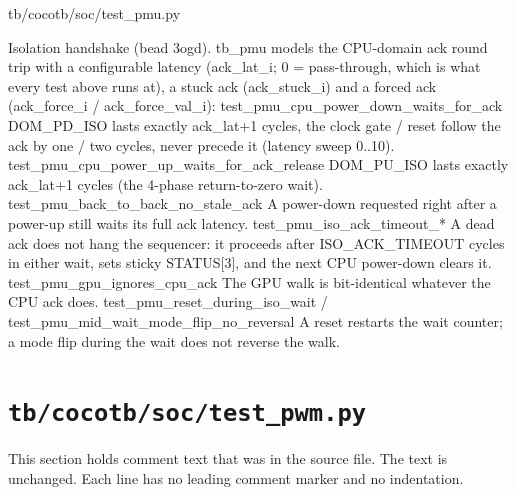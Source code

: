 \begin{relocated}{tb/cocotb/soc/test_pmu.py}
\begin{textblock}
Isolation handshake (bead 3ogd).  tb_pmu models the CPU-domain ack round trip with a
configurable latency (ack_lat_i; 0 = pass-through, which is what every test above runs at),
a stuck ack (ack_stuck_i) and a forced ack (ack_force_i / ack_force_val_i):
test_pmu_cpu_power_down_waits_for_ack
DOM_PD_ISO lasts exactly ack_lat+1 cycles, the clock gate / reset follow the ack by one /
two cycles, never precede it (latency sweep 0..10).
test_pmu_cpu_power_up_waits_for_ack_release
DOM_PU_ISO lasts exactly ack_lat+1 cycles (the 4-phase return-to-zero wait).
test_pmu_back_to_back_no_stale_ack
A power-down requested right after a power-up still waits its full ack latency.
test_pmu_iso_ack_timeout_*
A dead ack does not hang the sequencer: it proceeds after ISO_ACK_TIMEOUT cycles in either
wait, sets sticky STATUS[3], and the next CPU power-down clears it.
test_pmu_gpu_ignores_cpu_ack
The GPU walk is bit-identical whatever the CPU ack does.
test_pmu_reset_during_iso_wait / test_pmu_mid_wait_mode_flip_no_reversal
A reset restarts the wait counter; a mode flip during the wait does not reverse the walk.
\end{textblock}

\end{relocated}

\section{\texttt{tb/cocotb/soc/test\_pwm.py}}\label{tm:suite:soc-test-pwm}

This section holds comment text that was in the source file. The text is unchanged. Each line has no leading comment marker and no indentation.

